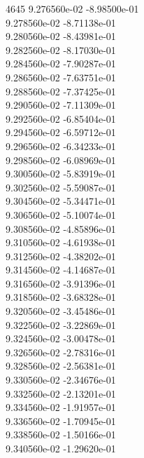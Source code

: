 4645	9.276560e-02	-8.98500e-01	\\ 	9.278560e-02	-8.71138e-01	\\ 	9.280560e-02	-8.43981e-01	\\ 	9.282560e-02	-8.17030e-01	\\ 	9.284560e-02	-7.90287e-01	\\ 	9.286560e-02	-7.63751e-01	\\ 	9.288560e-02	-7.37425e-01	\\ 	9.290560e-02	-7.11309e-01	\\ 	9.292560e-02	-6.85404e-01	\\ 	9.294560e-02	-6.59712e-01	\\ 	9.296560e-02	-6.34233e-01	\\ 	9.298560e-02	-6.08969e-01	\\ 	9.300560e-02	-5.83919e-01	\\ 	9.302560e-02	-5.59087e-01	\\ 	9.304560e-02	-5.34471e-01	\\ 	9.306560e-02	-5.10074e-01	\\ 	9.308560e-02	-4.85896e-01	\\ 	9.310560e-02	-4.61938e-01	\\ 	9.312560e-02	-4.38202e-01	\\ 	9.314560e-02	-4.14687e-01	\\ 	9.316560e-02	-3.91396e-01	\\ 	9.318560e-02	-3.68328e-01	\\ 	9.320560e-02	-3.45486e-01	\\ 	9.322560e-02	-3.22869e-01	\\ 	9.324560e-02	-3.00478e-01	\\ 	9.326560e-02	-2.78316e-01	\\ 	9.328560e-02	-2.56381e-01	\\ 	9.330560e-02	-2.34676e-01	\\ 	9.332560e-02	-2.13201e-01	\\ 	9.334560e-02	-1.91957e-01	\\ 	9.336560e-02	-1.70945e-01	\\ 	9.338560e-02	-1.50166e-01	\\ 	9.340560e-02	-1.29620e-01	\\ \hline
